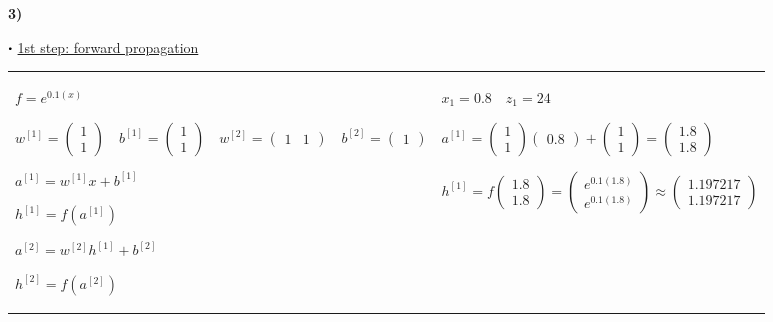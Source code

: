 \documentclass[11pt,a4paper]{article}
\newcommand\sbullet[1][.5]{\mathbin{\vcenter{\hbox{\scalebox{#1}{$\bullet$}}}}}
\begin{document}
\begin{flushleft}
\textbf{3)}
\par $\sbullet$ \underline{1st step: forward propagation} \par
\small
\begin{tabularx}{1.09\textwidth}{X X}
  \vspace{1.5mm}%
  $ f = e^{0.1(x)} $ \par \vspace{1mm}
  $ w^{[1]} = \begin{pmatrix} 1 \\ 1 \end{pmatrix} \quad b^{[1]} = \begin{pmatrix} 1 \\ 1 \end{pmatrix} \quad w^{[2]} = \begin{pmatrix} 1 & 1 \end{pmatrix} \quad b^{[2]} = \begin{pmatrix} 1 \end{pmatrix} $ \par \vspace{1mm}
  $ a^{[1]} = w^{[1]}x + b^{[1]} $ \par \vspace{1mm}
  $ h^{[1]} = f(a^{[1]}) $ \par \vspace{1mm}
  $ a^{[2]} = w^{[2]}h^{[1]} + b^{[2]} $ \par \vspace{1mm}
  $ h^{[2]} = f(a^{[2]}) $ \par \vspace{1mm}
  & %
  $ \boxed{x_1 = 0.8} \quad z_1 = 24 $ \par \vspace{1mm}
  $ a^{[1]} = \begin{pmatrix} 1 \\ 1 \end{pmatrix} \begin{pmatrix} 0.8 \end{pmatrix} + \begin{pmatrix} 1 \\ 1 \end{pmatrix} = \begin{pmatrix} 1.8 \\ 1.8 \end{pmatrix} $ \par \vspace{1mm}
  $ h^{[1]} = f \begin{pmatrix} 1.8 \\ 1.8 \end{pmatrix} = \begin{pmatrix} e^{0.1(1.8)} \\ e^{0.1(1.8)} \end{pmatrix} \approx \begin{pmatrix} 1.197217 \\ 1.197217 \end{pmatrix} $ \par \vspace{1mm}

\end{tabularx}
\end{flushleft}
\end{document}
